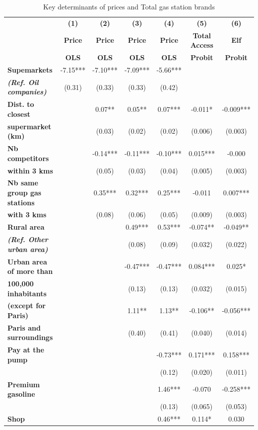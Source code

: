 \documentclass[english]{article}
\begin{document}
\begin{table}
\caption{Key determinants of prices and Total gas station brands}
\label{tab:price_and_total_brand_regs}
\begin{threeparttable}
\begin{footnotesize}
\begin{tabular}{l|cccccc}
\hline
\hline
 & \textbf{(1)}  & \textbf{(2)}  & \textbf{(3)}  & \textbf{(4)}  & \textbf{(5)}  & \textbf{(6)}\tabularnewline
 & \textbf{Price}  & \textbf{Price}  & \textbf{Price}  & \textbf{Price}  & \textbf{Total Access}  & \textbf{Elf}\tabularnewline
 & \textbf{OLS}  & \textbf{OLS}  & \textbf{OLS}  & \textbf{OLS}  & \textbf{Probit}  & \textbf{Probit}\tabularnewline
\hline
\textbf{Supemarkets}  & -7.15{*}{*}{*}  & -7.10{*}{*}{*}  & -7.09{*}{*}{*}  & -5.66{*}{*}{*}  &  & \tabularnewline
\textbf{\textit{(Ref. Oil companies)}}  & (0.31)  & (0.33)  & (0.33)  & (0.42)  &  & \tabularnewline
\hline
\textbf{Dist. to closest}  &  & 0.07{*}{*}  & 0.05{*}{*}  & 0.07{*}{*}{*}  & -0.011{*}  & -0.009{*}{*}{*}\tabularnewline
\textbf{supermarket (km)}  &  & (0.03)  & (0.02)  & (0.02)  & (0.006)  & (0.003)\tabularnewline
\textbf{Nb competitors}  &  & -0.14{*}{*}{*}  & -0.11{*}{*}{*}  & -0.10{*}{*}{*}  & 0.015{*}{*}{*}  & -0.000\tabularnewline
\textbf{within 3 kms}  &  & (0.05)  & (0.03)  & (0.04)  & (0.005)  & (0.003)\tabularnewline
\textbf{Nb same group gas stations}  &  & 0.35{*}{*}{*}  & 0.32{*}{*}{*}  & 0.25{*}{*}{*}  & -0.011  & 0.007{*}{*}{*}\tabularnewline
\textbf{with 3 kms}  &  & (0.08)  & (0.06)  & (0.05)  & (0.009)  & (0.003)\tabularnewline
\hline
\textbf{Rural area}  &  &  & 0.49{*}{*}{*}  & 0.53{*}{*}{*}  & -0.074{*}{*}  & -0.049{*}{*}\tabularnewline
\textbf{\textit{(Ref. Other urban area)}}  &  &  & (0.08)  & (0.09)  & (0.032)  & (0.022)\tabularnewline
\textbf{Urban area of more than}  &  &  & -0.47{*}{*}{*}  & -0.47{*}{*}{*}  & 0.084{*}{*}{*}  & 0.025{*}\tabularnewline
\textbf{100,000 inhabitants}  &  &  & (0.13)  & (0.13)  & (0.032)  & (0.015)\tabularnewline
\textbf{(except for Paris)}  &  &  & 1.11{*}{*}  & 1.13{*}{*}  & -0.106{*}{*}  & -0.056{*}{*}{*}\tabularnewline
\textbf{Paris and surroundings} &  &  & (0.40)  & (0.41)  & (0.040)  & (0.014)\tabularnewline
\hline
\textbf{Pay at the pump}  &  &  &  & -0.73{*}{*}{*}  & 0.171{*}{*}{*}  & 0.158{*}{*}{*}\tabularnewline
 &  &  &  & (0.12)  & (0.020)  & (0.011)\tabularnewline
\textbf{Premium gasoline}  &  &  &  & 1.46{*}{*}{*}  & -0.070  & -0.258{*}{*}{*}\tabularnewline
 &  &  &  & (0.13)  & (0.065)  & (0.053)\tabularnewline
\textbf{Shop}  &  &  &  & 0.46{*}{*}{*}  & 0.114{*}  & 0.030\tabularnewline

\end{tabular}
\end{footnotesize}
\end{threeparttable}
\end{table}
\end{document}
